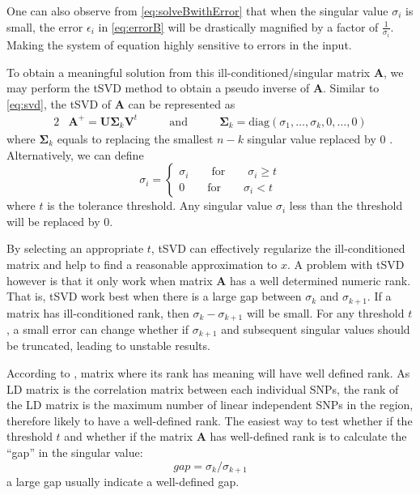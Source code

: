 			One can also observe from \cref{eq:solveBwithError} that when the singular value $\sigma_i$ is small, the error $\epsilon_i$ in \cref{eq:errorB} will be drastically magnified by a factor of $\frac{1}{\sigma_i}$. 
			Making the system of equation highly sensitive to errors in the input.
			
			To obtain a meaningful solution from this ill-conditioned/singular matrix $\boldsymbol{A}$, we may perform the \gls{tSVD} method to obtain a pseudo inverse of $\boldsymbol{A}$.
			Similar to \cref{eq:svd}, the \gls{tSVD} of $\boldsymbol{A}$ can be represented as 
			\begin{alignat}{2}
				&\boldsymbol{A}^+ = \boldsymbol{U\Sigma}_k\boldsymbol{V}^t  &\qquad\text{and}\qquad  &\boldsymbol{\Sigma}_k=\mathrm{diag}(\sigma_1,\dots,\sigma_k,0,\dots,0)
				\label{eq:tsvd}				
			\end{alignat}
			where $\boldsymbol{\Sigma}_k$ equals to replacing the smallest $n-k$ singular value replaced by 0 \citep{Hansen1987}. 
			Alternatively, we can define
			\begin{equation}
			\sigma_i=\begin{cases}
			\sigma_i\qquad\text{for}\qquad\sigma_i\ge t\\
			0\qquad\text{for}\qquad\sigma_i<t
			\end{cases}
			\end{equation}
			where $t$ is the tolerance threshold. 
			Any singular value $\sigma_i$ less than the threshold will be replaced by 0. 
			
			By selecting an appropriate $t$, \gls{tSVD} can effectively regularize the ill-conditioned matrix and help to find a reasonable approximation to $x$. 
			A problem with \gls{tSVD} however is that it only work when matrix $\boldsymbol{A}$ has a well determined numeric rank\citep{Hansen1987}.
			That is, \gls{tSVD} work best when there is a large gap between $\sigma_k$ and $\sigma_{k+1}$.
			If a matrix has ill-conditioned rank, then $\sigma_k-\sigma_{k+1}$ will be small.
			For any threshold $t$, a small error can change whether if $\sigma_{k+1}$ and subsequent singular values should be truncated, leading to unstable results. 
			
			According to \citet{Hansen1987}, matrix where its rank has meaning will have well defined rank. 
			As \gls{LD} matrix is the correlation matrix between each individual \glspl{SNP}, the rank of the \gls{LD} matrix is the maximum number of linear independent \glspl{SNP} in the region, therefore likely to have a well-defined rank. 
			The easiest way to test whether if the threshold $t$ and whether if the matrix $\boldsymbol{A}$ has well-defined rank is to calculate the ``gap'' in the singular value:
			\begin{equation}
			gap = \sigma_k/\sigma_{k+1}
			\label{eq:gapSingular}
			\end{equation}
			a large gap usually indicate a well-defined gap. 
			
